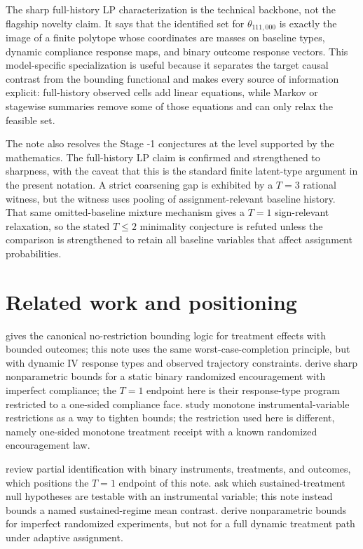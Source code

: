 \documentclass[11pt]{article}
\theoremstyle{definition}
\theoremstyle{plain}
\theoremstyle{remark}
\begin{document}
The sharp full-history LP characterization is the technical backbone, not the flagship novelty claim.  It says that the identified set for \(\theta_{111,000}\) is exactly the image of a finite polytope whose coordinates are masses on baseline types, dynamic compliance response maps, and binary outcome response vectors.  This model-specific specialization is useful because it separates the target causal contrast from the bounding functional and makes every source of information explicit: full-history observed cells add linear equations, while Markov or stagewise summaries remove some of those equations and can only relax the feasible set.

The note also resolves the Stage -1 conjectures at the level supported by the mathematics.  The full-history LP claim is confirmed and strengthened to sharpness, with the caveat that this is the standard finite latent-type argument in the present notation.  A strict coarsening gap is exhibited by a \(T=3\) rational witness, but the witness uses pooling of assignment-relevant baseline history.  That same omitted-baseline mixture mechanism gives a \(T=1\) sign-relevant relaxation, so the stated \(T\le2\) minimality conjecture is refuted unless the comparison is strengthened to retain all baseline variables that affect assignment probabilities.

\section{Related work and positioning}
\cite{Manski1990} gives the canonical no-restriction bounding logic for treatment effects with bounded outcomes; this note uses the same worst-case-completion principle, but with dynamic IV response types and observed trajectory constraints.  \cite{BalkePearl1997} derive sharp nonparametric bounds for a static binary randomized encouragement with imperfect compliance; the \(T=1\) endpoint here is their response-type program restricted to a one-sided compliance face.  \cite{ManskiPepper2000} study monotone instrumental-variable restrictions as a way to tighten bounds; the restriction used here is different, namely one-sided monotone treatment receipt with a known randomized encouragement law.

\cite{SwansonHernanMillerRobinsRichardson2018} review partial identification with binary instruments, treatments, and outcomes, which positions the \(T=1\) endpoint of this note.  \cite{SwansonLabrecqueHernan2018} ask which sustained-treatment null hypotheses are testable with an instrumental variable; this note instead bounds a named sustained-regime mean contrast.  \cite{GabrielSjolanderSachs2023} derive nonparametric bounds for imperfect randomized experiments, but not for a full dynamic treatment path under adaptive assignment.
\end{document}
